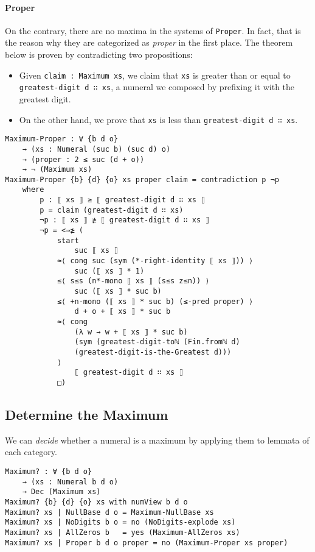 \documentclass[\main/thesis.tex]{subfiles}
\begin{document}
\paragraph{Proper}

On the contrary, there are no maxima in the systems of {\lstinline|Proper|}.
In fact, that is the reason why they are categorized as \textit{proper} in the
first place. The theorem below is proven by contradicting two propositions:

\begin{itemize}
    \item Given {\lstinline|claim : Maximum xs|}, we claim that {\lstinline|xs|}
        is greater than or equal to {\lstinline|greatest-digit d ∷ xs|},
        a numeral we composed by prefixing it with the greatest digit.
    \item On the other hand, we prove that {\lstinline|xs|} is less than
        {\lstinline|greatest-digit d ∷ xs|}.
\end{itemize}

\begin{lstlisting}
Maximum-Proper : ∀ {b d o}
    → (xs : Numeral (suc b) (suc d) o)
    → (proper : 2 ≤ suc (d + o))
    → ¬ (Maximum xs)
Maximum-Proper {b} {d} {o} xs proper claim = contradiction p ¬p
    where
        p : ⟦ xs ⟧ ≥ ⟦ greatest-digit d ∷ xs ⟧
        p = claim (greatest-digit d ∷ xs)
        ¬p : ⟦ xs ⟧ ≱ ⟦ greatest-digit d ∷ xs ⟧
        ¬p = <⇒≱ (
            start
                suc ⟦ xs ⟧
            ≈⟨ cong suc (sym (*-right-identity ⟦ xs ⟧)) ⟩
                suc (⟦ xs ⟧ * 1)
            ≤⟨ s≤s (n*-mono ⟦ xs ⟧ (s≤s z≤n)) ⟩
                suc (⟦ xs ⟧ * suc b)
            ≤⟨ +n-mono (⟦ xs ⟧ * suc b) (≤-pred proper) ⟩
                d + o + ⟦ xs ⟧ * suc b
            ≈⟨ cong
                (λ w → w + ⟦ xs ⟧ * suc b)
                (sym (greatest-digit-toℕ (Fin.fromℕ d)
                (greatest-digit-is-the-Greatest d)))
            ⟩
                ⟦ greatest-digit d ∷ xs ⟧
            □)
\end{lstlisting}

\subsection{Determine the Maximum}

We can \textit{decide} whether a numeral is a maximum by applying them to
lemmata of each category.

\begin{lstlisting}
Maximum? : ∀ {b d o}
    → (xs : Numeral b d o)
    → Dec (Maximum xs)
Maximum? {b} {d} {o} xs with numView b d o
Maximum? xs | NullBase d o = Maximum-NullBase xs
Maximum? xs | NoDigits b o = no (NoDigits-explode xs)
Maximum? xs | AllZeros b   = yes (Maximum-AllZeros xs)
Maximum? xs | Proper b d o proper = no (Maximum-Proper xs proper)
\end{lstlisting}
\end{document}
